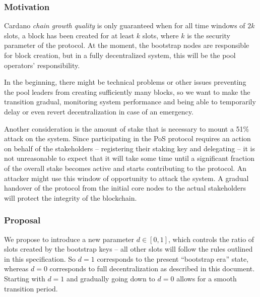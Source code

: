 \documentclass[11pt,a4paper]{article}
\begin{document}
\subsubsection{Motivation}
\label{motivation}

Cardano \emph{chain growth quality} is only guaranteed when for all time windows
of \(2k\) slots, a block has been created for at least \(k\) slots, where \(k\)
is the security parameter of the protocol. At the moment, the bootstrap nodes
are responsible for block creation, but in a fully decentralized system, this
will be the pool operators' responsibility.

In the beginning, there might be technical problems or other issues
preventing the pool leaders from creating sufficiently many blocks, so
we want to make the transition gradual, monitoring system performance
and being able to temporarily delay or even revert decentralization in
case of an emergency.

Another consideration is the amount of stake that is necessary to mount
a 51\% attack on the system. Since participating in the PoS protocol
requires an action on behalf of the stakeholders -- registering their
staking key and delegating -- it is not unreasonable to expect that it
will take some time until a significant fraction of the overall stake
becomes active and starts contributing to the protocol. An attacker
might use this window of opportunity to attack the system. A gradual
handover of the protocol from the initial core nodes to the actual
stakeholders will protect the integrity of the blockchain.

\subsubsection{Proposal}
\label{proposal}

We propose to introduce a new parameter \(d\in[0,1]\), which controls
the ratio of slots created by the bootstrap keys -- all other slots will
follow the rules outlined in this specification. So \(d=1\) corresponds
to the present ``bootstrap era'' state, whereas \(d=0\) corresponds to
full decentralization as described in this document. Starting with
\(d=1\) and gradually going down to \(d=0\) allows for a smooth
transition period.
\end{document}
